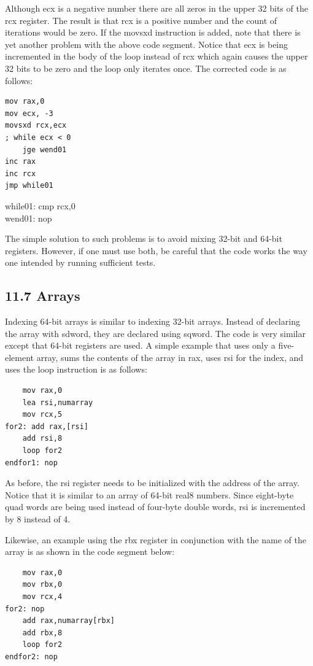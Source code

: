 \documentclass[10pt]{article}
\begin{document}
Although ecx is a negative number there are all zeros in the upper 32 bits of the rcx register. The result is that rcx is a positive number and the count of iterations would be zero. If the movsxd instruction is added, note that there is yet another problem with the above code segment. Notice that ecx is being incremented in the body of the loop instead of rcx which again causes the upper 32 bits to be zero and the loop only iterates once. The corrected code is as follows:

\begin{verbatim}
mov rax,0
mov ecx, -3
movsxd rcx,ecx
; while ecx < 0
    jge wend01
inc rax
inc rcx
jmp while01
\end{verbatim}

while01: cmp rcx,0\\
wend01: nop

The simple solution to such problems is to avoid mixing 32-bit and 64-bit registers. However, if one must use both, be careful that the code works the way one intended by running sufficient tests.

\subsection*{11.7 Arrays}
Indexing 64-bit arrays is similar to indexing 32-bit arrays. Instead of declaring the array with sdword, they are declared using sqword. The code is very similar except that 64-bit registers are used. A simple example that uses only a five-element array, sums the contents of the array in rax, uses rsi for the index, and uses the loop instruction is as follows:

\begin{verbatim}
    mov rax,0
    lea rsi,numarray
    mov rcx,5
for2: add rax,[rsi]
    add rsi,8
    loop for2
endfor1: nop
\end{verbatim}

As before, the rsi register needs to be initialized with the address of the array. Notice that it is similar to an array of 64-bit real8 numbers. Since eight-byte quad words are being used instead of four-byte double words, rsi is incremented by 8 instead of 4.

Likewise, an example using the rbx register in conjunction with the name of the array is as shown in the code segment below:

\begin{verbatim}
    mov rax,0
    mov rbx,0
    mov rcx,4
for2: nop
    add rax,numarray[rbx]
    add rbx,8
    loop for2
endfor2: nop
\end{verbatim}
\end{document}
